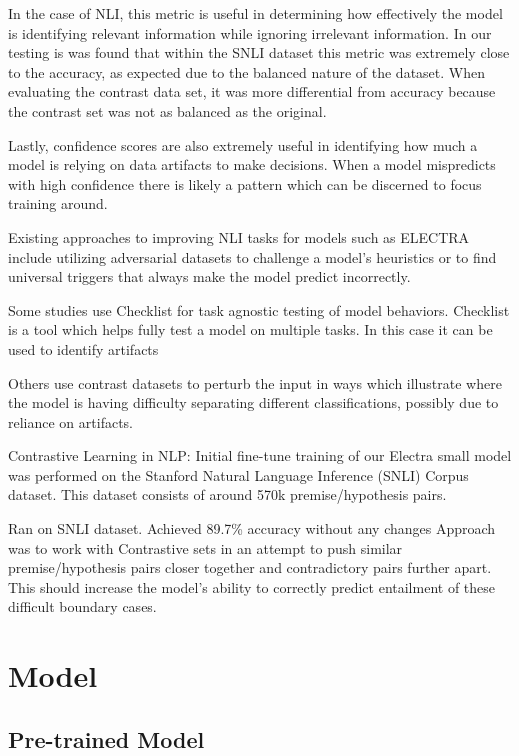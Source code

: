 \documentclass[11pt]{article}
\begin{document}
In the case of NLI, this metric is useful in determining how effectively the model is identifying relevant information while ignoring irrelevant information.  In our testing is was found that within the SNLI dataset this metric was extremely close to the accuracy, as expected due to the balanced nature of the dataset.  When evaluating the contrast data set, it was more differential from accuracy because the contrast set was not as balanced as the original.

Lastly, confidence scores are also extremely useful in identifying how much a model is relying on data artifacts to make decisions. When a model mispredicts with high confidence there is likely a pattern which can be discerned to focus training around.

Existing approaches to improving NLI tasks for models such as ELECTRA include utilizing adversarial datasets to challenge a model's heuristics \citealp{adversarial1} or to find universal triggers that always make the model predict incorrectly. \citealp{wallace2021universaladversarialtriggersattacking}

Some studies use Checklist for task agnostic testing of model behaviors. Checklist is a tool which helps fully test a model on multiple tasks. In this case it can be used to identify artifacts \citealp{checklist}

Others use contrast datasets to perturb the input in ways which illustrate where the model is having difficulty separating different classifications, possibly due to reliance on artifacts.  \citealp{localdecisionboundaries}

Contrastive Learning in NLP:
Initial fine-tune training of our Electra small model was performed on the Stanford Natural Language Inference (SNLI) Corpus dataset. This dataset consists of around 570k premise/hypothesis pairs. \citealp{snlicorpus}

Ran on SNLI dataset. Achieved 89.7\% accuracy without any changes
Approach was to work with Contrastive sets in an attempt to push similar premise/hypothesis pairs closer together and contradictory pairs further apart. This should increase the model's ability to correctly predict entailment of these difficult boundary cases.


\section{Model}
\subsection{Pre-trained Model}
\end{document}
